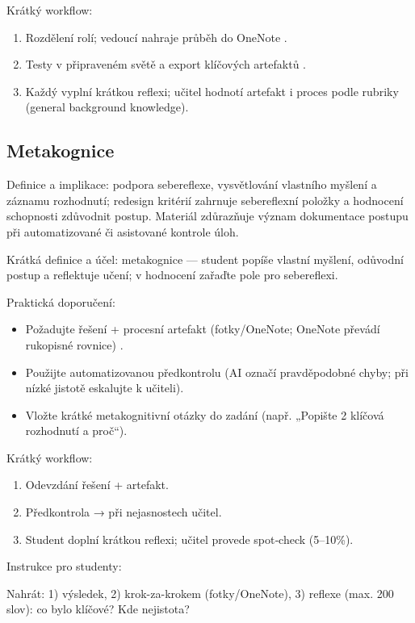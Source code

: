 \documentclass{report}%
\begin{document}
Krátký workflow: \begin{enumerate} \item Rozdělení rolí; vedoucí nahraje průběh do OneNote \cite{kb_ai_101_tipu_pdf_04e4a115_page_8_1}. \item Testy v připraveném světě a export klíčových artefaktů \cite{kb_ai_101_tipu_pdf_04e4a115_page_15_2}. \item Každý vyplní krátkou reflexi; učitel hodnotí artefakt i proces podle rubriky (general background knowledge). \end{enumerate}%

%
\subsection{Metakognice}%
Definice a implikace: podpora sebereflexe, vysvětlování vlastního myšlení a záznamu rozhodnutí; redesign kritérií zahrnuje sebereflexní položky a hodnocení schopnosti zdůvodnit postup. Materiál zdůrazňuje význam dokumentace postupu při automatizované či asistované kontrole úloh.%


%
Krátká definice a účel: metakognice — student popíše vlastní myšlení, odůvodní postup a reflektuje učení; v hodnocení zařaďte pole pro sebereflexi.

Praktická doporučení:
\begin{itemize}
  \item Požadujte řešení + procesní artefakt (fotky/OneNote; OneNote převádí rukopisné rovnice) \cite{kb_ai_101_tipu_pdf_04e4a115_page_8_1}.
  \item Použijte automatizovanou předkontrolu (AI označí pravděpodobné chyby; při nízké jistotě eskalujte k učiteli).
  \item Vložte krátké metakognitivní otázky do zadání (např. „Popište 2 klíčová rozhodnutí a proč“).
\end{itemize}

Krátký workflow:
\begin{enumerate}
  \item Odevzdání řešení + artefakt.
  \item Předkontrola → při nejasnostech učitel.
  \item Student doplní krátkou reflexi; učitel provede spot‑check (5–10\%).
\end{enumerate}

Instrukce pro studenty: 
\begin{PromptBlock}


Nahrát: 1) výsledek, 2) krok-za-krokem (fotky/OneNote), 3) reflexe (max. 200 slov): co bylo klíčové? Kde nejistota?
\end{PromptBlock}
\end{document}
